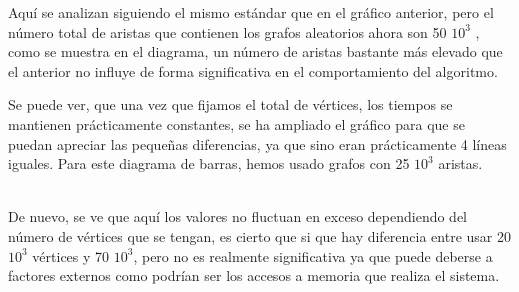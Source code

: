 \documentclass[a4paper]{llncs}
\begin{document}
\medskip
Aquí se analizan siguiendo el mismo estándar que en el gráfico anterior, pero el número total de aristas que contienen los grafos aleatorios ahora son 50 \cdot $10^3$ , como se muestra en el diagrama, un número de aristas bastante más elevado que el anterior no influye de forma significativa en el comportamiento del algoritmo.\\[0.5cm ]
\medskip

Se puede ver, que una vez que fijamos el total de vértices, los tiempos se mantienen prácticamente constantes, se ha ampliado el gráfico para que se puedan apreciar las pequeñas diferencias, ya que sino eran prácticamente 4 líneas iguales. Para este diagrama de barras, hemos usado grafos con 25 \cdot $10^3$ aristas.
\medskip

\medskip
\\
De nuevo, se ve que aquí los valores no fluctuan en exceso dependiendo del número de vértices que se tengan, es cierto que si que hay diferencia entre usar 20 \cdot $10^3$ vértices y 70 \cdot $10^3$, pero no es realmente significativa ya que puede deberse a factores externos como podrían ser los accesos a memoria que realiza el sistema.
\end{document}
